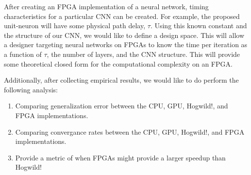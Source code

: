 After creating an FPGA implementation of a neural network, timing characteristics for a particular CNN can be created. For example, the proposed unit-neuron will have some physical path delay, $\tau$. Using this known constant and the structure of our CNN, we would like to define a design space. This will allow a designer targeting neural networks on FPGAs to know the time per iteration as a function of $\tau$, the number of layers, and the CNN structure. This will provide some theoretical closed form for the computational complexity on an FPGA.

Additionally, after collecting empirical results, we would like to do perform the following analysis:
\begin{enumerate}
	\item Comparing generalization error between the CPU, GPU, Hogwild!, and FPGA implementations.
	\item Comparing convergance rates between the CPU, GPU, Hogwild!, and FPGA implementations.
	\item Provide a metric of when FPGAs might provide a larger speedup than Hogwild!
\end{enumerate}